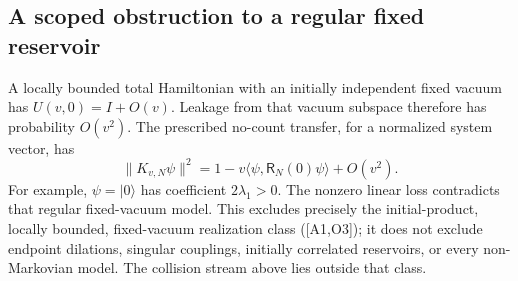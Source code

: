 \documentclass[11pt,letterpaper]{article}
\numberwithin{equation}{section}
\theoremstyle{remark}
\newcommand{\ket}[1]{\lvert #1\rangle}
\newcommand{\ip}[2]{\langle #1,#2\rangle}
\newcommand{\loss}{\mathsf R}
\newcommand{\ev}[1]{\textsf{[#1]}}
\begin{document}
\subsection{A scoped obstruction to a regular fixed reservoir}
A locally bounded total Hamiltonian with an initially independent
fixed vacuum has $U(v,0)=I+O(v)$. Leakage from that vacuum subspace
therefore has probability $O(v^2)$. The prescribed no-count transfer,
for a normalized system vector, has
\begin{equation}
 \|K_{v,N}\psi\|^2
 =1-v\ip\psi{\loss_N(0)\psi}+O(v^2). \label{eq:shorttime}
\end{equation}
For example, $\psi=\ket0$ has coefficient $2\lambda_1>0$.
The nonzero linear loss contradicts that regular fixed-vacuum model.
This excludes precisely the initial-product, locally bounded,
fixed-vacuum realization class (\ev{A1,O3}); it does not exclude
endpoint dilations, singular couplings, initially correlated reservoirs,
or every non-Markovian model. The collision stream above lies outside
that class.
\end{document}
